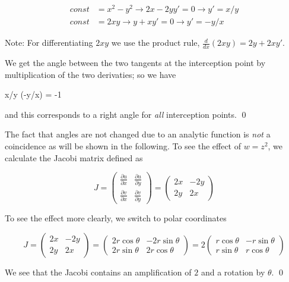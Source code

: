 \begin{align*}
    const &= x^2 - y^2 \rightarrow 2x - 2y y' = 0 \rightarrow y' = x/y \\ 
    const &= 2xy \rightarrow y + xy' = 0 \rightarrow y' = -y/x
\end{align*}

Note: For differentiating $2xy$ we use the product rule, $\frac{d}{dx} (2xy) = 2y + 2 x y'$.

We get the angle between the two tangents at the interception point by multiplication of the two derivaties; so we have

\bee
x/y \times (-y/x) = -1
\eee

and this corresponds to a right angle for \emph{all} interception points. \qed

The fact that angles are not changed due to an analytic function is \emph{not} a coincidence as will be shown in the following. To see the effect of $w = z^2$, we calculate the Jacobi matrix defined as

\begin{equation*}
	J = \begin{pmatrix} \frac{\partial u}{\partial x} & \frac{\partial u}{\partial y} \\ \frac{\partial v}{\partial x} & \frac{\partial v}{\partial y} \end{pmatrix} = \begin{pmatrix}
		2x & -2y \\ 2y & 2x \end{pmatrix}
\end{equation*}

To see the effect more clearly, we switch to polar coordinates

\begin{equation*}
	J = \begin{pmatrix} 2x & -2y \\ 2y & 2x \end{pmatrix} = \begin{pmatrix} 2 r \cos \theta & -2 r \sin \theta \\ 2 r \sin\theta & 2 r \cos \theta \end{pmatrix} = 2 \begin{pmatrix} r \cos \theta & - r \sin \theta \\ r \sin\theta & r \cos \theta \end{pmatrix}
\end{equation*}

We see that the Jacobi contains an amplification of $2$ and a rotation by $\theta$. \qed

